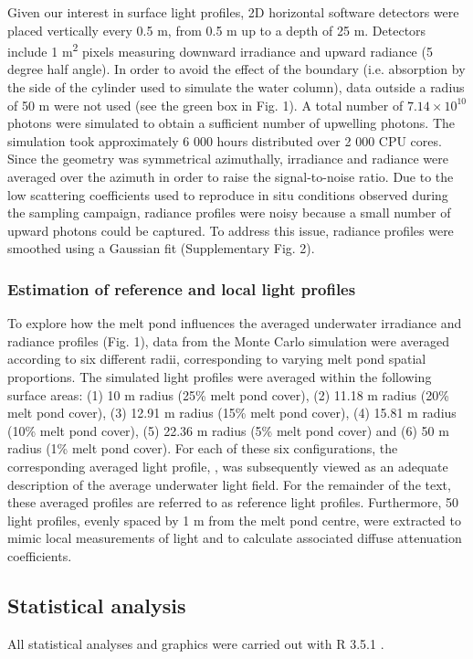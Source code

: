 Given our interest in surface light profiles, 2D horizontal software detectors were placed vertically every 0.5 m, from 0.5 m up to a depth of 25 m. Detectors include 1 m\textsuperscript{2} pixels measuring downward irradiance and upward radiance (5 degree half angle). In order to avoid the effect of the boundary (i.e. absorption by the side of the cylinder used to simulate the water column), data outside a radius of 50 m were not used (see the green box in Fig. 1). A total number of $7.14 \times 10^{10}$ photons were simulated to obtain a sufficient number of upwelling photons. The simulation took approximately 6 000 hours distributed over 2 000 CPU cores. Since the geometry was symmetrical azimuthally, irradiance and radiance were averaged over the azimuth in order to raise the signal-to-noise ratio. Due to the low scattering coefficients used to reproduce in situ conditions observed during the sampling campaign, radiance profiles were noisy because a small number of upward photons could be captured. To address this issue, radiance profiles were smoothed using a Gaussian fit (Supplementary Fig. 2). 

\subsubsection{Estimation of reference and local light profiles}

To explore how the melt pond influences the averaged underwater irradiance and radiance profiles (Fig. 1), data from the Monte Carlo simulation were averaged according to six different radii, corresponding to varying melt pond spatial proportions. The simulated light profiles were averaged within the following surface areas: (1) 10 m radius (25\% melt pond cover), (2) 11.18 m radius (20\% melt pond cover), (3) 12.91 m radius (15\% melt pond cover), (4) 15.81 m radius (10\% melt pond cover), (5) 22.36 m radius (5\% melt pond cover) and (6) 50 m radius (1\% melt pond cover). For each of these six configurations, the corresponding averaged light profile, \meanedz{}, was subsequently viewed as an adequate description of the average underwater light field. For the remainder of the text, these averaged profiles are referred to as reference light profiles. Furthermore, 50 light profiles, evenly spaced by 1 m from the melt pond centre, were extracted to mimic local measurements of light and to calculate associated diffuse attenuation coefficients.

\subsection{Statistical analysis}

All statistical analyses and graphics were carried out with R 3.5.1 \citep{RCoreTeam2018}. 